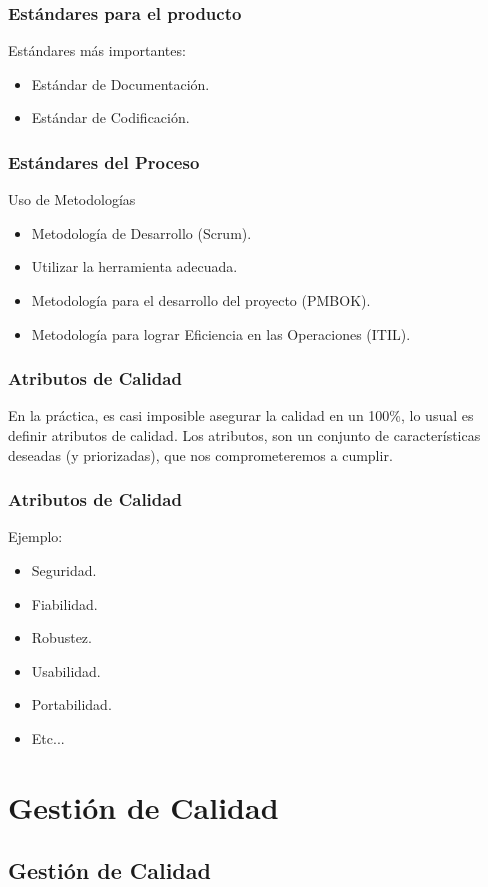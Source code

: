 \documentclass[12pt]{beamer}
\begin{document}
\begin{frame}
 \frametitle{Estándares para el producto}
 Estándares más importantes:
 \begin{itemize}
  \item<2-> Estándar de Documentación.
  \item<3-> Estándar de Codificación.
 \end{itemize}
\end{frame}


\begin{frame}
 \frametitle{Estándares del Proceso}
 Uso de \alert{Metodologías}
 \begin{itemize}
  \item<2-> Metodología de Desarrollo (Scrum).
  \item<3-> Utilizar la herramienta adecuada.
  \item<4-> Metodología para el desarrollo del proyecto (PMBOK).
  \item<5-> Metodología para lograr Eficiencia en las Operaciones (ITIL).
 \end{itemize}
\end{frame}


\begin{frame}
 \frametitle{Atributos de Calidad}
 En la práctica, es casi imposible asegurar la calidad en un 100\%, lo usual es definir \alert{atributos} de calidad. 
 \newline
 \pause
 Los atributos, son un conjunto de características deseadas (y priorizadas), que nos comprometeremos a cumplir.
\end{frame}


\begin{frame}
 \frametitle{Atributos de Calidad}
 Ejemplo:
 \begin{itemize}
  \item<2-> Seguridad.
  \item<3-> Fiabilidad.
  \item<4-> Robustez.
  \item<5-> Usabilidad.
  \item<6-> Portabilidad.
  \item<7-> Etc...
 \end{itemize}
\end{frame}


\section{Gestión de Calidad}
\subsection{Gestión de Calidad}
\end{document}
